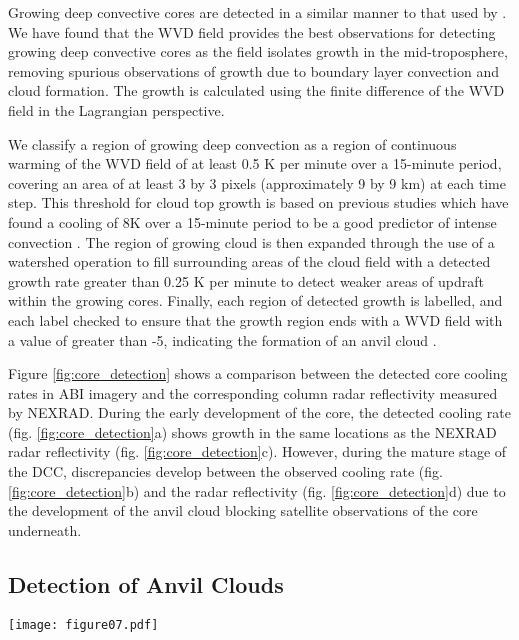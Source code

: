 Growing deep convective cores are detected in a similar manner to that used by \citet{zinner_cb-tram:_2008}.
We have found that the WVD field provides the best observations for detecting growing deep convective cores as the field isolates growth in the mid-troposphere, removing spurious observations of growth due to boundary layer convection and cloud formation.
The growth is calculated using the finite difference of the WVD field in the Lagrangian perspective.

We classify a region of growing deep convection as a region of continuous warming of the WVD field of at least 0.5 \unit{K} per minute over a 15-minute period, covering an area of at least 3 by 3 pixels (approximately 9 by 9 km) at each time step.
This threshold for cloud top growth is based on previous studies which have found a cooling of 8\unit{K} over a 15-minute period to be a good predictor of intense convection \citep{roberts_nowcasting_2003, hartung_intercomparison_2013}.
The region of growing cloud is then expanded through the use of a watershed operation to fill surrounding areas of the cloud field with a detected growth rate greater than 0.25 \unit{K} per minute to detect weaker areas of updraft within the growing cores.
Finally, each region of detected growth is labelled, and each label checked to ensure that the growth region ends with a WVD field with a value of greater than -5, indicating the formation of an anvil cloud \citep{muller_role_2018}.

Figure \ref{fig:core_detection} shows a comparison between the detected core cooling rates in ABI imagery and the corresponding column radar reflectivity measured by NEXRAD. 
During the early development of the core, the detected cooling rate (fig. \ref{fig:core_detection}a) shows growth in the same locations as the NEXRAD radar reflectivity (fig. \ref{fig:core_detection}c).
However, during the mature stage of the DCC, discrepancies develop between the observed cooling rate (fig.\ref{fig:core_detection}b) and the radar reflectivity (fig. \ref{fig:core_detection}d) due to the development of the anvil cloud blocking satellite observations of the core underneath.

\subsection{Detection of Anvil Clouds}

\begin{figure*}[t]
    \texttt{[image: figure07.pdf]}
    \caption{Detection of anvil cloud extent for the mature DCC cluster in \ref{fig:compare_sat_radar_glm} using the edge gradient method. a.: The combined field of the WVD minus the SWD, to isolate the thick anvil, between the upper and lower thresholds of -5 and -15\unit{K} respectively. b.: the detected edge gradient magnitude of the field between these thresholds, which is used to detect the outer extent of the thick anvil cloud. c.: the combined field of WVD plus the SWD, to enhance the thin anvil, and d.: the calculated edge magnitude of this field.}
    \label{fig:edge_detection}
\end{figure*}

